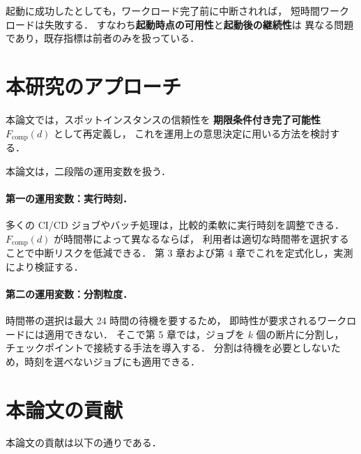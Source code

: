 \documentclass[11pt,a4paper]{ltjsreport}
\newcommand{\Fcomp}{F_{\mathrm{comp}}}
\begin{document}
起動に成功したとしても，ワークロード完了前に中断されれば，
短時間ワークロードは失敗する．
すなわち\textbf{起動時点の可用性}と\textbf{起動後の継続性}は
異なる問題であり，既存指標は前者のみを扱っている．

\section{本研究のアプローチ}

本論文では，スポットインスタンスの信頼性を
\textbf{期限条件付き完了可能性} $\Fcomp(d)$ として再定義し，
これを運用上の意思決定に用いる方法を検討する．

本論文は，二段階の運用変数を扱う．

\paragraph{第一の運用変数：実行時刻．}
多くの CI/CD ジョブやバッチ処理は，比較的柔軟に実行時刻を調整できる．
$\Fcomp(d)$ が時間帯によって異なるならば，
利用者は適切な時間帯を選択することで中断リスクを低減できる．
第 3 章および第 4 章でこれを定式化し，実測により検証する．

\paragraph{第二の運用変数：分割粒度．}
時間帯の選択は最大 24 時間の待機を要するため，
即時性が要求されるワークロードには適用できない．
そこで第 5 章では，ジョブを $k$ 個の断片に分割し，
チェックポイントで接続する手法を導入する．
分割は待機を必要としないため，時刻を選べないジョブにも適用できる．

\section{本論文の貢献}

本論文の貢献は以下の通りである．
\end{document}
